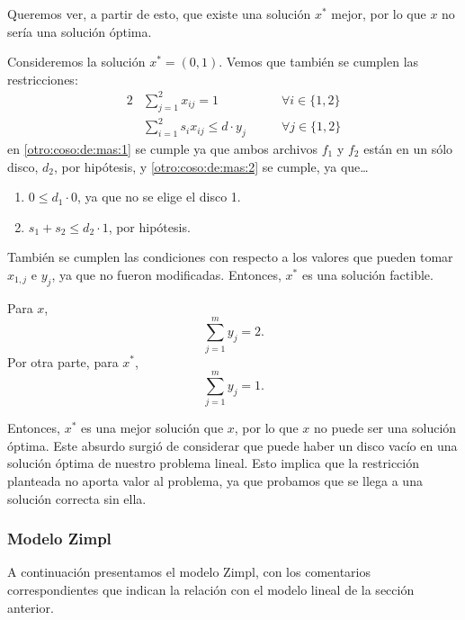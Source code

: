 \documentclass[11pt, a4paper, pdftex]{article}
\begin{document}
Queremos ver, a partir de esto, que existe una solución $x^{*}$ mejor,
por lo que $x$ no sería una solución óptima.

Consideremos la solución $x^{*} = (0, 1)$. Vemos que también se cumplen las
restricciones:
\begin{alignat}{2}
	& \sum_{j = 1}^{2} x_{ij} = 1                     &\qquad \forall i \in \{1, 2\}\label{otro:coso:de:mas:1}\\
	& \sum_{i = 1}^{2} s_{i} x_{ij} \le d \cdot y_{j} &\qquad \forall j \in \{1, 2\}\label{otro:coso:de:mas:2}
\end{alignat}
en \eqref{otro:coso:de:mas:1} se cumple ya que ambos archivos $f_{1}$ y
$f_{2}$ están en un sólo disco, $d_{2}$, por hipótesis, y
\eqref{otro:coso:de:mas:2} se cumple, ya que\ldots
\begin{enumerate}
	\item $0 \leq d_{1} \cdot 0$, ya que no se elige el disco 1.
	\item $s_{1} + s_{2} \leq d_{2} \cdot 1$, por hipótesis.
\end{enumerate}

También se cumplen las condiciones con respecto a los valores que pueden
tomar $x_{1, j}$ e $y_{j}$, ya que no fueron modificadas. Entonces,
$x^{*}$ es una solución factible.

Para $x$,
\begin{displaymath}
	\sum_{j = 1}^{m} y_{j} = 2.
\end{displaymath}
Por otra parte, para $x^{*}$,
\begin{displaymath}
	\sum_{j = 1}^{m} y_{j} = 1.
\end{displaymath}

Entonces, $x^{*}$ es una mejor solución que $x$, por lo que $x$ no puede
ser una solución óptima. Este absurdo surgió de considerar que puede
haber un disco vacío en una solución óptima de nuestro problema lineal.
Esto implica que la restricción planteada no aporta valor al problema,
ya que probamos que se llega a una solución correcta sin ella.

\newpage

\subsubsection{Modelo Zimpl}

A continuación presentamos el modelo Zimpl, con los comentarios
correspondientes que indican la relación con el modelo lineal de la sección
anterior.
\end{document}
